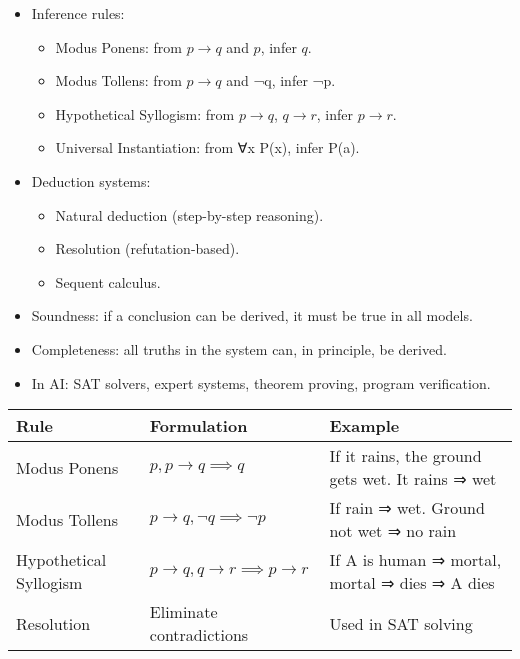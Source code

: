\documentclass[
  letterpaper,
  DIV=11,
  numbers=noendperiod]{scrreprt}
\providecommand{\tightlist}{%
  \setlength{\itemsep}{0pt}\setlength{\parskip}{0pt}}
\begin{document}
\begin{itemize}
\item
  Inference rules:

  \begin{itemize}
  \tightlist
  \item
    Modus Ponens: from \(p → q\) and \(p\), infer \(q\).
  \item
    Modus Tollens: from \(p → q\) and ¬q, infer ¬p.
  \item
    Hypothetical Syllogism: from \(p → q\), \(q → r\), infer \(p → r\).
  \item
    Universal Instantiation: from ∀x P(x), infer P(a).
  \end{itemize}
\item
  Deduction systems:

  \begin{itemize}
  \tightlist
  \item
    Natural deduction (step-by-step reasoning).
  \item
    Resolution (refutation-based).
  \item
    Sequent calculus.
  \end{itemize}
\item
  Soundness: if a conclusion can be derived, it must be true in all
  models.
\item
  Completeness: all truths in the system can, in principle, be derived.
\item
  In AI: SAT solvers, expert systems, theorem proving, program
  verification.
\end{itemize}

\begin{longtable}[]{@{}
  >{\raggedright\arraybackslash}p{}
  >{\raggedright\arraybackslash}p{}
  >{\raggedright\arraybackslash}p{}@{}}
\toprule\noalign{}
\begin{minipage}[b]{\linewidth}\raggedright
Rule
\end{minipage} & \begin{minipage}[b]{\linewidth}\raggedright
Formulation
\end{minipage} & \begin{minipage}[b]{\linewidth}\raggedright
Example
\end{minipage} \\
\midrule\noalign{}
\endhead
\bottomrule\noalign{}
\endlastfoot
Modus Ponens & \(p, p → q ⟹ q\) & If it rains, the ground gets wet. It
rains ⇒ wet \\
Modus Tollens & \(p → q, ¬q ⟹ ¬p\) & If rain ⇒ wet. Ground not wet ⇒ no
rain \\
Hypothetical Syllogism & \(p → q, q → r ⟹ p → r\) & If A is human ⇒
mortal, mortal ⇒ dies ⇒ A dies \\
Resolution & Eliminate contradictions & Used in SAT solving \\
\end{longtable}
\end{document}
